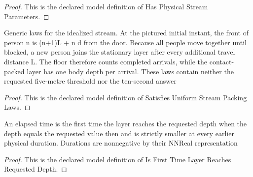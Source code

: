 \begin{proof}
  This is the declared model definition of Has Physical Stream Parameters.
\end{proof}
\begin{definition}
  \label{def:physics:phyx-mini-0728:phyxminiproblems-problemphyxmini0728-satisfiesuniformstreampackinglaws}
  Generic laws for the idealized stream. At the pictured initial instant, the front of person n is (n+1)L + n d from the door. Because all people move together until blocked, a new person joins the stationary layer after every additional travel distance L. The floor therefore counts completed arrivals, while the contact-packed layer has one body depth per arrival. These laws contain neither the requested five-metre threshold nor the ten-second answer
\end{definition}
\begin{proof}
  This is the declared model definition of Satisfies Uniform Stream Packing Laws.
\end{proof}
\begin{definition}
  \label{def:physics:phyx-mini-0728:phyxminiproblems-problemphyxmini0728-isfirsttimelayerreachesrequesteddepth}
  An elapsed time is the first time the layer reaches the requested depth when the depth equals the requested value then and is strictly smaller at every earlier physical duration. Durations are nonnegative by their NNReal representation
\end{definition}
\begin{proof}
  This is the declared model definition of Is First Time Layer Reaches Requested Depth.
\end{proof}
